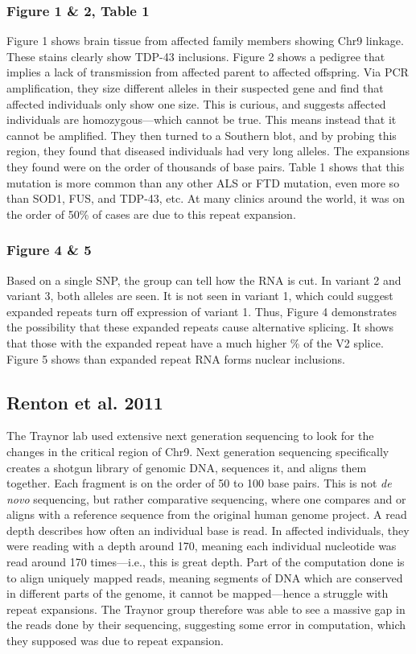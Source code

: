 \documentclass[12pt]{report}
\begin{document}
\subsubsection{Figure 1 \& 2, Table 1}

Figure 1 shows brain tissue from affected family members showing Chr9 linkage. These stains clearly show TDP-43 inclusions. Figure 2 shows a pedigree that implies a lack of transmission from affected parent to affected offspring. Via PCR amplification, they size different alleles in their suspected gene and find that affected individuals only show one size. This is curious, and suggests affected individuals are homozygous---which cannot be true. This means instead that it cannot be amplified. They then turned to a Southern blot, and by probing this region, they found that diseased individuals had very long alleles. The expansions they found were on the order of thousands of base pairs. Table 1 shows that this mutation is more common than any other ALS or FTD mutation, even more so than SOD1, FUS, and TDP-43, etc. At many clinics around the world, it was on the order of 50\% of cases are due to this repeat expansion. 

\subsubsection{Figure 4 \& 5}

Based on a single SNP, the group can tell how the RNA is cut. In variant 2 and variant 3, both alleles are seen. It is not seen in variant 1, which could suggest expanded repeats turn off expression of variant 1. Thus, Figure 4 demonstrates the possibility that these expanded repeats cause alternative splicing. It shows that those with the expanded repeat have a much higher \% of the V2 splice. Figure 5 shows than expanded repeat RNA forms nuclear inclusions. 

\subsection{Renton et al. 2011}

The Traynor lab used extensive next generation sequencing to look for the changes in the critical region of Chr9. Next generation sequencing specifically creates a shotgun library of genomic DNA, sequences it, and aligns them together. Each fragment is on the order of 50 to 100 base pairs. This is not \textit{de novo} sequencing, but rather comparative sequencing, where one compares and or aligns with a reference sequence from the original human genome project. A read depth describes how often an individual base is read. In affected individuals, they were reading with a depth around 170, meaning each individual nucleotide was read around 170 times---i.e., this is great depth. Part of the computation done is to align uniquely mapped reads, meaning segments of DNA which are conserved in different parts of the genome, it cannot be mapped---hence a struggle with repeat expansions. The Traynor group therefore was able to see a massive gap in the reads done by their sequencing, suggesting some error in computation, which they supposed was due to repeat expansion.\newline
\end{document}
